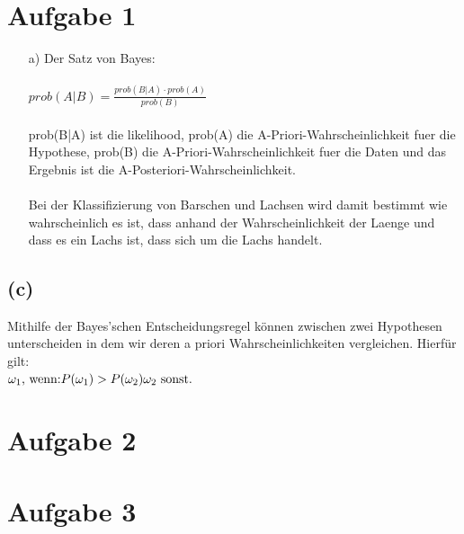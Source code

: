 \documentclass[a4paper]{scrartcl}
\begin{document}
	
\section*{Aufgabe 1}
\begin{itemize}
	\item[a)] Der Satz von Bayes:\\ \ \\
	$prob(A|B) = \frac{prob(B|A) \cdot prob(A)}{prob(B)}$\\
	\ \\
	prob(B|A) ist die likelihood, prob(A) die A-Priori-Wahrscheinlichkeit fuer die Hypothese, prob(B) die A-Priori-Wahrscheinlichkeit fuer die Daten und das Ergebnis ist die A-Posteriori-Wahrscheinlichkeit.\\
	\ \\
	Bei der Klassifizierung von Barschen und Lachsen wird damit bestimmt wie wahrscheinlich es ist, dass anhand der Wahrscheinlichkeit der Laenge und dass es ein Lachs ist, dass sich um die Lachs handelt. 
\end{itemize}















\subsection*{(c)}
Mithilfe der Bayes'schen Entscheidungsregel können zwischen zwei Hypothesen unterscheiden in dem wir deren a priori Wahrscheinlichkeiten vergleichen. Hierfür gilt:\\
$
\omega_1 \text{, wenn:} P(\omega_1) > P(\omega_2)\\
\omega_2 \text{ sonst.}
$

\section*{Aufgabe 2}

\section*{Aufgabe 3}
\end{document}
